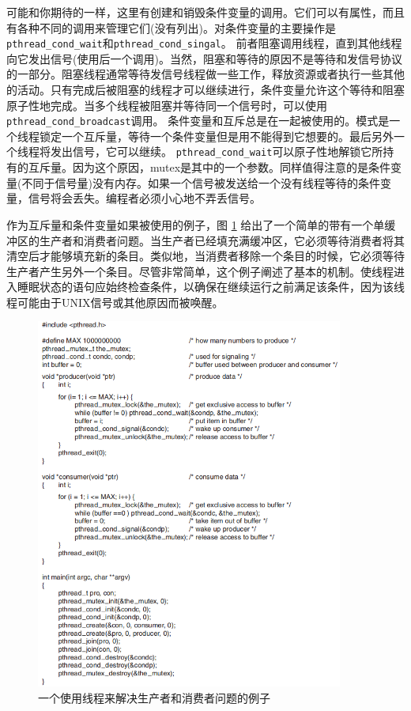 	可能和你期待的一样，这里有创建和销毁条件变量的调用。它们可以有属性，而且有各种不同的调用来管理它们(没有列出)。对条件变量的主要操作是\texttt{pthread\_cond\_wait}和\texttt{pthread\_cond\_singal}。
	前者阻塞调用线程，直到其他线程向它发出信号(使用后一个调用)。当然，阻塞和等待的原因不是等待和发信号协议的一部分。阻塞线程通常等待发信号线程做一些工作，释放资源或者执行一些其他的活动。只有完成后被阻塞的线程才可以继续进行，条件变量允许这个等待和阻塞原子性地完成。当多个线程被阻塞并等待同一个信号时，可以使用\texttt{pthread\_cond\_broadcast}调用。
	条件变量和互斥总是在一起被使用的。模式是一个线程锁定一个互斥量，等待一个条件变量但是用不能得到它想要的。最后另外一个线程将发出信号，它可以继续。
	\texttt{pthread\_cond\_wait}可以原子性地解锁它所持有的互斥量。因为这个原因，mutex是其中的一个参数。同样值得注意的是条件变量(不同于信号量)没有内存。如果一个信号被发送给一个没有线程等待的条件变量，信号将会丢失。编程者必须小心地不弄丢信号。
	
	作为互斥量和条件变量如果被使用的例子，图 \ref{fig:thread-producer-consumer} 给出了一个简单的带有一个单缓冲区的生产者和消费者问题。当生产者已经填充满缓冲区，它必须等待消费者将其清空后才能够填充新的条目。类似地，当消费者移除一个条目的时候，它必须等待生产者产生另外一个条目。尽管非常简单，这个例子阐述了基本的机制。使线程进入睡眠状态的语句应始终检查条件，以确保在继续运行之前满足该条件，因为该线程可能由于UNIX信号或其他原因而被唤醒。
	
	\begin{figure}[ht]\small
		\centering
		\includegraphics[width=0.90\textwidth]{FIG/2-32.png}
		\caption{一个使用线程来解决生产者和消费者问题的例子} \label{fig:thread-producer-consumer}
	\end{figure}
	
